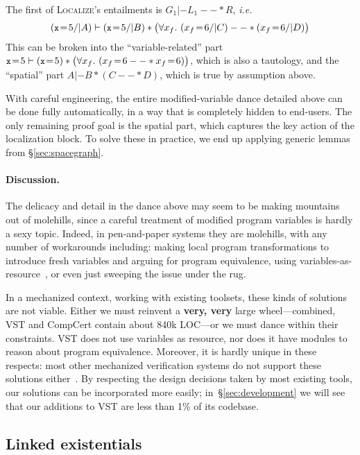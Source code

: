 The first of \textsc{Localize}'s entailments is $G_1 |- L_1 --* R$, \emph{i.e.}
\[
(\li{x} \! = \! 5 /| A) |- (\li{x} \! = \! 5 /| B) * \big(\forall x_f.~ (x_f \! = \! 6 /| C) --* (x_f \! = \! 6 /| D) \big)
\]
This can be broken into the ``variable-related'' part $\li{x} \! = \! 5 |- (\li{x} \! = \! 5) * \big(\forall x_f.~ (x_f \! = \! 6 --* x_f \! = \! 6)\big)$, which is also a tautology, and the ``spatial'' part $A |- B * (C --* D)$, which is true by assumption above.

With careful engineering, the entire modified-variable dance detailed above 
can be done fully automatically, in a way that is completely hidden to end-users.  
The only remaining proof
goal is the spatial part, which captures the key action of the localization block.  To solve
these in practice, we end up applying generic lemmas from \S\ref{sec:spacegraph}.

\paragraph{Discussion.} The delicacy and detail in the dance above may seem to be making
mountains out of molehills, since a careful treatment of modified program variables is
hardly a sexy topic.  Indeed, in pen-and-paper systems they are molehills, with any
number of workarounds including: making local program transformations to introduce
fresh variables and arguing for program equivalence, using
variables-as-resource~\cite{bornat:var}, or even just sweeping the issue under the rug.

In a mechanized context, working with existing toolsets, these kinds of solutions are
not viable.  Either we must reinvent a \textbf{very, very} large wheel---combined,
VST and CompCert contain about 840k LOC---or we must dance within their constraints.
VST does not use variables as resource, nor does it have modules to reason about program equivalence.  Moreover, it is hardly unique in these respects: most other mechanized verification systems do not support these solutions either~\cite{beckert:2007,distefanop08,bengtson:charge,chin:hipsleek}.  By respecting the design
decisions taken by most existing tools, our solutions can be incorporated more easily; in~\S\ref{sec:development} we will see that our additions to VST are less than 1\% of its codebase.

\subsection{Linked existentials}
\label{sec:linkedex}

